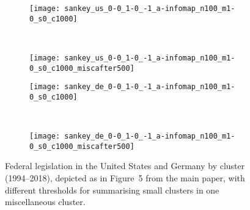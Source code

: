 \newpage

\begin{figure}[H]
	\vspace*{-16pt}
	\centering
	\begin{subfigure}{0.45\linewidth}
		\texttt{[image: sankey\_us\_0-0\_1-0\_-1\_a-infomap\_n100\_m1-0\_s0\_c1000]}
	\end{subfigure}~%
	\begin{subfigure}{0.45\linewidth}
		\texttt{[image: sankey\_us\_0-0\_1-0\_-1\_a-infomap\_n100\_m1-0\_s0\_c1000\_miscafter500]}
	\end{subfigure}
	
	\begin{subfigure}{0.45\linewidth}
		\texttt{[image: sankey\_de\_0-0\_1-0\_-1\_a-infomap\_n100\_m1-0\_s0\_c1000]}
	\end{subfigure}~%
	\begin{subfigure}{0.45\linewidth}
		\texttt{[image: sankey\_de\_0-0\_1-0\_-1\_a-infomap\_n100\_m1-0\_s0\_c1000\_miscafter500]}
	\end{subfigure}
	\caption{Federal legislation in the United States and Germany by cluster (1994--2018), depicted as in Figure~5 from the main paper, with different thresholds for summarising small clusters in one miscellaneous cluster.}
	\label{fig:sankey-500}
\end{figure}
